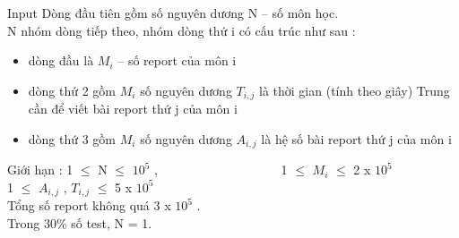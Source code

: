Input
Dòng đầu tiên gồm số nguyên dương N – số môn học.
\\N nhóm dòng tiếp theo, nhóm dòng thứ i có cấu trúc như sau :
\begin{itemize}
	\item dòng đầu là $M_{i}$ – số report của môn i
	\item dòng thứ 2 gồm $M_{i}$ số nguyên dương $T_{i,j}$ là thời gian (tính theo giây) Trung cần để viết bài report thứ j của môn i
	\item dòng thứ 3 gồm $M_{i}$ số nguyên dương $A_{i,j}$ là hệ số bài report thứ j của môn i
\end{itemize}

Giới hạn : 1  $\le$  N  $\le$  $10^{5}$ ,                    1  $\le$  $M_{i}$  $\le$  2 x $10^{5}$
\\1  $\le$  $A_{i,j}$ , $T_{i,j}$  $\le$  5 x $10^{5}$
\\Tổng số report không quá 3 x $10^{5}$ .
\\Trong 30\% số test, N = 1.